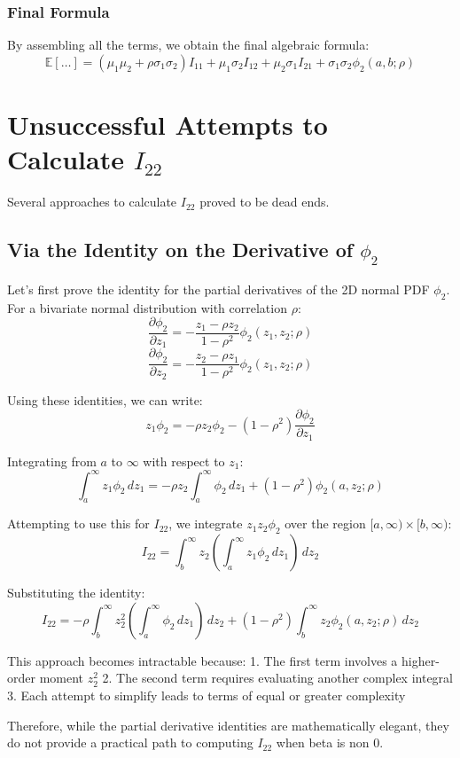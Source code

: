 \documentclass[11pt, a4paper]{article}
\newcommand{\E}{\mathbb{E}}
\newcommand{\dd}{\,d} %
\begin{document}
\subsubsection*{Final Formula}
By assembling all the terms, we obtain the final algebraic formula:
\[
\E[\dots] = (\mu_1\mu_2 + \rho\sigma_1\sigma_2) I_{11} + \mu_1\sigma_2 I_{12} + \mu_2\sigma_1 I_{21} + \sigma_1\sigma_2 \phi_2(a, b; \rho)
\]

\newpage
\newpage
\section{Unsuccessful Attempts to Calculate $I_{22}$}
Several approaches to calculate $I_{22}$ proved to be dead ends.
\subsection{Via the Identity on the Derivative of $\phi_2$}
Let's first prove the identity for the partial derivatives of the 2D normal PDF $\phi_2$. For a bivariate normal distribution with correlation $\rho$:
\[
\frac{\partial \phi_2}{\partial z_1} = -\frac{z_1 - \rho z_2}{1-\rho^2} \phi_2(z_1, z_2; \rho)
\]
\[
\frac{\partial \phi_2}{\partial z_2} = -\frac{z_2 - \rho z_1}{1-\rho^2} \phi_2(z_1, z_2; \rho)
\]

Using these identities, we can write:
\[
z_1\phi_2 = -\rho z_2\phi_2 - (1-\rho^2)\frac{\partial \phi_2}{\partial z_1}
\]

Integrating from $a$ to $\infty$ with respect to $z_1$:
\[
\int_a^\infty z_1\phi_2 \dd z_1 = -\rho z_2\int_a^\infty \phi_2 \dd z_1 + (1-\rho^2)\phi_2(a, z_2; \rho)
\]

Attempting to use this for $I_{22}$, we integrate $z_1z_2\phi_2$ over the region $[a,\infty) \times [b,\infty)$:
\[
I_{22} = \int_b^\infty z_2 \left(\int_a^\infty z_1\phi_2 \dd z_1\right) \dd z_2
\]

Substituting the identity:
\[
I_{22} = -\rho \int_b^\infty z_2^2 \left(\int_a^\infty \phi_2 \dd z_1\right) \dd z_2 + (1-\rho^2)\int_b^\infty z_2\phi_2(a, z_2; \rho) \dd z_2
\]

This approach becomes intractable because:
1. The first term involves a higher-order moment $z_2^2$
2. The second term requires evaluating another complex integral
3. Each attempt to simplify leads to terms of equal or greater complexity

Therefore, while the partial derivative identities are mathematically elegant, they do not provide a practical path to computing $I_{22}$ when beta is non 0.
\newpage
\end{document}
